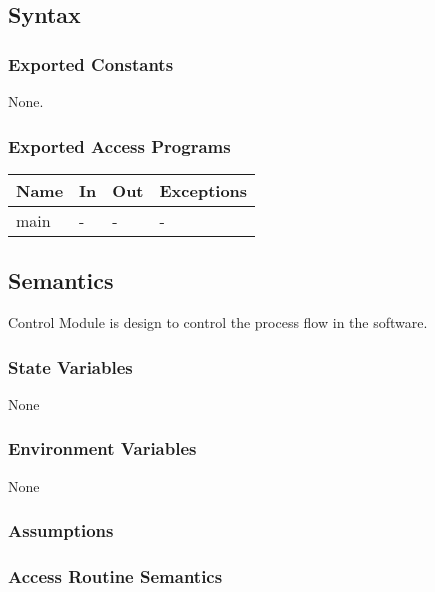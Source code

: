\documentclass[12pt, titlepage]{article}
\begin{document}
\subsection{Syntax}

\subsubsection{Exported Constants}
None.
\subsubsection{Exported Access Programs}

\begin{center}
\begin{tabular}{p{2cm} p{4cm} p{4cm} p{2cm}}
\hline
\textbf{Name} & \textbf{In} & \textbf{Out} & \textbf{Exceptions} \\
\hline
main & - & - & - \\
\hline
\end{tabular}
\end{center}

\subsection{Semantics}
\progname{} Control Module is design to control the process flow in the software.

\subsubsection{State Variables}

None

\subsubsection{Environment Variables}

None

\subsubsection{Assumptions}


\subsubsection{Access Routine Semantics}
\end{document}
